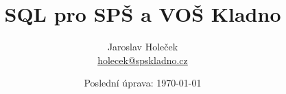 \documentclass[10pt,a4paper]{article}
\author{Jaroslav Holeček\\ \href{mailto:holecek@spskladno.cz}{holecek@spskladno.cz}}
\title{SQL pro SPŠ a VOŠ Kladno}
\date{Poslední úprava: \today}
\begin{document}
\doclicenseThis
\maketitle
\tableofcontents



\end{document}
